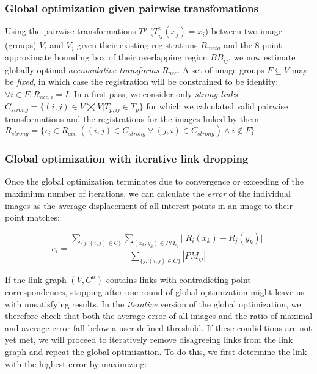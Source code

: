 \subsubsection{Global optimization given pairwise transfomations}

Using the pairwise transformations $T^{p}$ ($T^p_{ij} (x_{j}) = x_i$) between two image (groups) $V_i$ and $V_j$ given their existing registrations $R_{meta}$ and the 8-point approximate bounding box of their overlapping region $BB_{ij}$, we now estimate globally optimal \emph{accumulative transforms} $R_{acc}$. A set of image groups $F \subseteq V$ may be \emph{fixed}, in which case the registration will be constrained to be identity: $\forall i \in F: R_{acc,i} = I$. In a first pass, we consider only \emph{strong links} $C_{strong} = \{(i,j) \in V \bigtimes V | T_{p, ij} \in T_p \}$ for which we calculated valid pairwise transformations and the registrations for the images linked by them $R_{strong} = \{r_i \in R_{acc} | ((i,j) \in C_{strong} \vee (j,i) \in C_{strong}) \wedge i \notin F\}$

\subsubsection{Global optimization with iterative link dropping}

Once the global optimization terminates due to convergence or exceeding of the maximium number of iterations, we can calculate the \emph{error} of the individual images as the average displacement of all interest points in an image to their point matches:

\begin{equation}
\label{eq:gloablopt-eq2}
e_i = \frac{\sum_{\{j: (i,j) \in C\}}  \sum_{(x_{k}, y_{k}) \in PM_{ij}} || R_{i}( x_{k}) - R_{j}( y_{k}) ||  }{ \sum_{\{j: (i,j) \in C\}} |PM_{ij}| }
\end{equation}

If the link graph $(V,C^n)$ contains links with contradicting point correspondences, stopping after one round of global optimization might leave us with unsatisfying results. In the \emph{iterative} version of the global optimization, we therefore check that both the average error of all images and the ratio of maximal and average error fall below a user-defined threshold. If these condiditions are not yet met, we will proceed to iteratively remove disagreeing links from the link graph and repeat the global optimization. To do this, we first determine the link with the highest error by maximizing:

